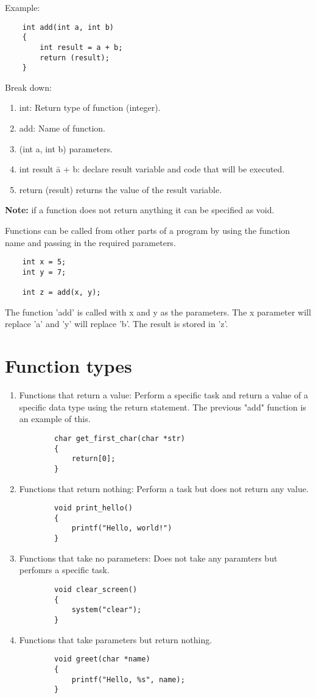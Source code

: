 \documentclass[12pt, letterpaper]{report}
\begin{document}
Example:
\begin{lstlisting}
	int add(int a, int b)
	{
		int result = a + b;
		return (result);
	}
\end{lstlisting}
 
Break down:
\begin{enumerate}
	\item int: Return type of function (integer).
	\item add: Name of function.
	\item (int a, int b)\: parameters.
	\item int result \= a + b: declare result variable and code that will be executed.
	\item return (result)\: returns the value of the result variable.
\end{enumerate}

\textbf{Note:} if a function does not return anything it can be specified as void.

Functions can be called from other parts of a program by using the function name 
and passing in the required parameters.

\begin{lstlisting}
	int x = 5;
	int y = 7;

	int z = add(x, y);
\end{lstlisting}
The function 'add' is called with x and y as the parameters. The x parameter 
will replace 'a' and 'y' will replace 'b'. The result is stored in 'z'.


\section{Function types}

\begin{enumerate}
	\item Functions that return a value:
		Perform a specific task and return a value of a specific data type using 
		the return statement. The previous "add" function is an example of this.
	\begin{lstlisting}
		char get_first_char(char *str)
		{
			return[0];
		}
	\end{lstlisting}
	\item Functions that return nothing:
	Perform a task but does not return any value.
	\begin{lstlisting}
		void print_hello()
		{
			printf("Hello, world!")
		}
	\end{lstlisting}
	\item Functions that take no parameters:
		Does not take any paramters but perfomrs a specific task.
	\begin{lstlisting}
		void clear_screen()
		{
			system("clear");
		}
	\end{lstlisting}
	\item Functions that take parameters but return nothing.
	\begin{lstlisting}
		void greet(char *name)
		{
			printf("Hello, %s", name);
		}
	\end{lstlisting}
\end{enumerate}
\end{document}
